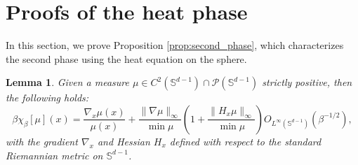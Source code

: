 \documentclass{article}
\numberwithin{theorem}{section}
\newtheorem{lemma}[theorem]{Lemma}
\begin{document}
\section{Proofs of the heat phase}
\label{app:second_phase}
In this section, we prove Proposition \ref{prop:second_phase}, which characterizes the second phase using the heat equation on the sphere.
\begin{lemma}
    \label{lem:bh_bounded_chi} 
    Given a measure $\mu\in C^2(\mathbb{S}^{d-1})\cap\mathcal{P}(\mathbb{S}^{d-1})$ strictly positive, then the following holds:
    $$
    \beta\chi_\beta[\mu](x)=\frac{\nabla_x\mu(x)}{\mu(x)} + \frac{\|\nabla\mu\|_\infty}{\min \mu}\left(1+\frac{\|H_x\mu\|_\infty}{\min \mu}\right) O_{L^\infty(\mathbb{S}^{d-1})}(\beta^{-1/2}),
    $$
    with the gradient $\nabla_x$ and Hessian $H_x$ defined with respect to the standard Riemannian metric on $\mathbb{S}^{d-1}$.
\end{lemma}
\end{document}
